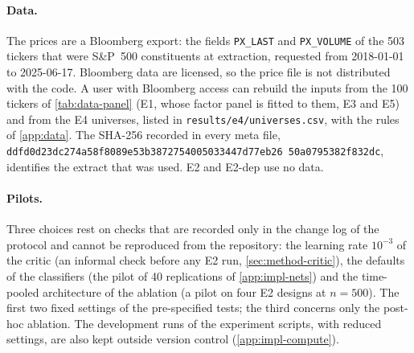 \paragraph{Data.}
The prices are a Bloomberg export: the fields \texttt{PX\_LAST} and \texttt{PX\_VOLUME} of the
503 tickers that were S\&P~500 constituents at extraction, requested from 2018-01-01 to
2025-06-17. Bloomberg data are licensed, so the price file is not distributed
with the code. A user with Bloomberg access can rebuild the inputs from the 100 tickers of
\cref{tab:data-panel} (E1, whose factor panel is fitted to them, E3 and E5) and from the E4
universes, listed in \texttt{results/e4/universes.csv}, with the rules of \cref{app:data}. The
SHA-256 recorded in every meta file,
\texttt{ddfd0d23dc274a58\allowbreak f8089e53b3872754\allowbreak 005033447d77eb26\allowbreak
50a0795382f832dc}, identifies the extract that was used. E2 and E2-dep use no data.

\paragraph{Pilots.}
Three choices rest on checks that are recorded only in the change log of the protocol and cannot
be reproduced from the repository: the learning rate $10^{-3}$ of the critic (an informal check
before any E2 run, \cref{sec:method-critic}), the defaults of the classifiers (the pilot of 40
replications of \cref{app:impl-nets}) and the time-pooled architecture of the ablation (a pilot
on four E2 designs at $n=500$). The first two fixed settings of the pre-specified tests; the
third concerns only the post-hoc ablation. The development runs of the experiment scripts, with
reduced settings, are also kept outside version control (\cref{app:impl-compute}).
